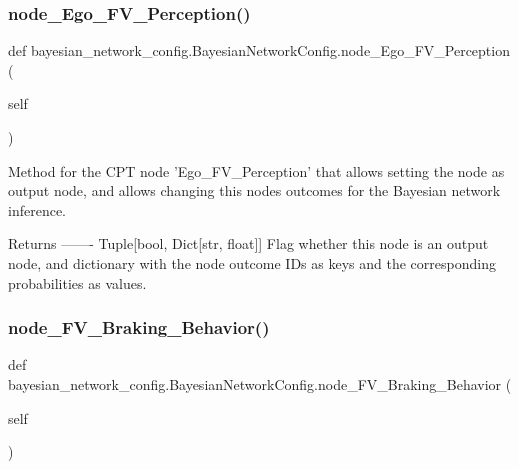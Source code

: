 \subsubsection{\texorpdfstring{node\+\_\+\+Ego\+\_\+\+F\+V\+\_\+\+Perception()}{node\_Ego\_FV\_Perception()}\hspace{0.1cm}{\footnotesize\ttfamily [3/3]}}
{\footnotesize\ttfamily def bayesian\+\_\+network\+\_\+config.\+Bayesian\+Network\+Config.\+node\+\_\+\+Ego\+\_\+\+F\+V\+\_\+\+Perception (\begin{DoxyParamCaption}\item[{}]{self }\end{DoxyParamCaption})}

\begin{DoxyVerb}Method for the CPT node 'Ego_FV_Perception' that allows setting the node as output node,
and allows changing this nodes outcomes for the Bayesian network inference.

Returns
-------
Tuple[bool, Dict[str, float]]
    Flag whether this node is an output node, and dictionary with the node outcome IDs as keys
    and the corresponding probabilities as values.
\end{DoxyVerb}
 \mbox{\label{classbayesian__network__config_1_1_bayesian_network_config_a424061edb518c981c0e1ceed918a6d2f}} 
\subsubsection{\texorpdfstring{node\+\_\+\+F\+V\+\_\+\+Braking\+\_\+\+Behavior()}{node\_FV\_Braking\_Behavior()}}
{\footnotesize\ttfamily def bayesian\+\_\+network\+\_\+config.\+Bayesian\+Network\+Config.\+node\+\_\+\+F\+V\+\_\+\+Braking\+\_\+\+Behavior (\begin{DoxyParamCaption}\item[{}]{self }\end{DoxyParamCaption})}

